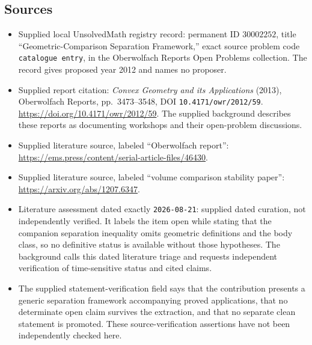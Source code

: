\documentclass[11pt]{article}
\begin{document}
\subsection{Sources}
\begin{itemize}
\item Supplied local UnsolvedMath registry record: permanent ID \(30002252\), title ``Geometric-Comparison Separation Framework,'' exact source problem code \texttt{catalogue entry}, in the Oberwolfach Reports Open Problems collection. The record gives proposed year 2012 and names no proposer.
\item Supplied report citation: \emph{Convex Geometry and its Applications} (2013), Oberwolfach Reports, pp.~3473--3548, DOI \texttt{10.4171/owr/2012/59}. \url{https://doi.org/10.4171/owr/2012/59}. The supplied background describes these reports as documenting workshops and their open-problem discussions.
\item Supplied literature source, labeled ``Oberwolfach report'': \url{https://ems.press/content/serial-article-files/46430}.
\item Supplied literature source, labeled ``volume comparison stability paper'': \url{https://arxiv.org/abs/1207.6347}.
\item Literature assessment dated exactly \texttt{2026-08-21}: supplied dated curation, not independently verified. It labels the item open while stating that the companion separation inequality omits geometric definitions and the body class, so no definitive status is available without those hypotheses. The background calls this dated literature triage and requests independent verification of time-sensitive status and cited claims.
\item The supplied statement-verification field says that the contribution presents a generic separation framework accompanying proved applications, that no determinate open claim survives the extraction, and that no separate clean statement is promoted. These source-verification assertions have not been independently checked here.
\end{itemize}
\end{document}
